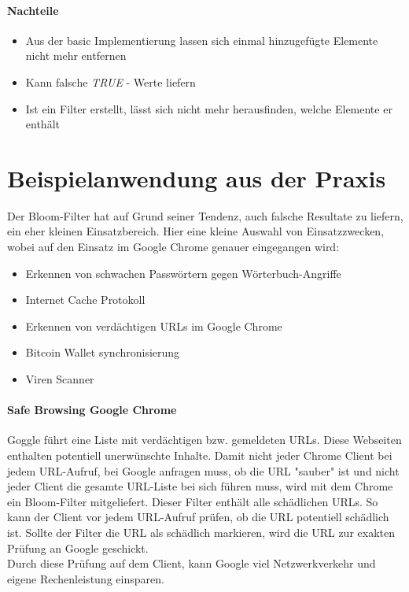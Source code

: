 \documentclass[12pt]{article}
\begin{document}
\paragraph*{Nachteile}
\begin{itemize}
\item Aus der basic Implementierung lassen sich einmal hinzugefügte Elemente nicht mehr entfernen
\item Kann falsche {\it TRUE} - Werte liefern
\item Ist ein Filter erstellt, lässt sich nicht mehr herausfinden, welche Elemente er enthält
\end{itemize}

\section*{Beispielanwendung aus der Praxis}
Der Bloom-Filter hat auf Grund seiner Tendenz,
auch falsche Resultate zu liefern, ein eher kleinen Einsatzbereich.
Hier eine kleine Auswahl von Einsatzzwecken,
wobei auf den Einsatz im Google Chrome genauer eingegangen wird:
\begin{itemize}
\item Erkennen von schwachen Passwörtern gegen Wörterbuch-Angriffe
\item Internet Cache Protokoll
\item Erkennen von verdächtigen URLs im Google Chrome
\item Bitcoin Wallet synchronisierung
\item Viren Scanner
\end{itemize}
\paragraph*{Safe Browsing Google Chrome}
Goggle führt eine Liste mit verdächtigen bzw. gemeldeten URLs.
Diese Webseiten enthalten potentiell unerwünschte Inhalte.
Damit nicht jeder Chrome Client bei jedem URL-Aufruf,
bei Google anfragen muss, ob die URL "sauber" ist und
nicht jeder Client die gesamte URL-Liste bei sich führen muss,
wird mit dem Chrome ein Bloom-Filter mitgeliefert.
Dieser Filter enthält alle schädlichen URLs.
So kann der Client vor jedem URL-Aufruf prüfen,
ob die URL potentiell schädlich ist.
Sollte der Filter die URL als schädlich markieren,
wird die URL zur exakten Prüfung an Google geschickt.
\\
Durch diese Prüfung auf dem Client,
kann Google viel Netzwerkverkehr und eigene Rechenleistung einsparen.
\end{document}
